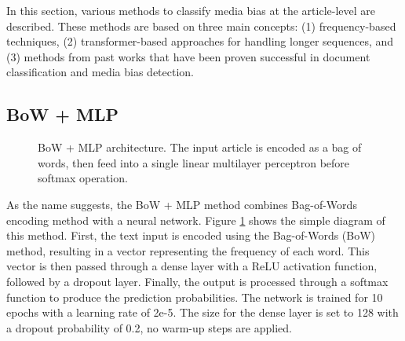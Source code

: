 In this section, various methods to classify media bias at the article-level are described. These methods are based on three main concepts: (1) frequency-based techniques, (2) transformer-based approaches for handling longer sequences, and (3) methods from past works that have been proven successful in document classification and media bias detection.


\subsection{BoW + MLP}

\begin{figure}[htbp]
    \centering
    \caption{BoW + MLP architecture. The input article is encoded as a bag of words, then feed into a single linear multilayer perceptron before softmax operation.}
    \label{fig:bow_mlp_architecture}
\end{figure}

As the name suggests, the BoW + MLP method combines Bag-of-Words encoding method with a neural network. Figure \ref{fig:bow_mlp_architecture} shows the simple diagram of this method. First, the text input is encoded using the Bag-of-Words (BoW) method, resulting in a vector representing the frequency of each word. This vector is then passed through a dense layer with a ReLU activation function, followed by a dropout layer. Finally, the output is processed through a softmax function to produce the prediction probabilities. The network is trained for 10 epochs with a learning rate of 2e-5. The size for the dense layer is set to 128 with a dropout probability of 0.2, no warm-up steps are applied.

